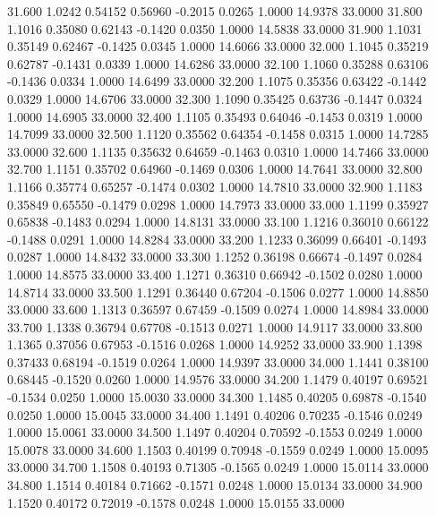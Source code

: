   31.600   1.0242   0.54152   0.56960  -0.2015   0.0265   1.0000  14.9378  33.0000
  31.800   1.1016   0.35080   0.62143  -0.1420   0.0350   1.0000  14.5838  33.0000
  31.900   1.1031   0.35149   0.62467  -0.1425   0.0345   1.0000  14.6066  33.0000
  32.000   1.1045   0.35219   0.62787  -0.1431   0.0339   1.0000  14.6286  33.0000
  32.100   1.1060   0.35288   0.63106  -0.1436   0.0334   1.0000  14.6499  33.0000
  32.200   1.1075   0.35356   0.63422  -0.1442   0.0329   1.0000  14.6706  33.0000
  32.300   1.1090   0.35425   0.63736  -0.1447   0.0324   1.0000  14.6905  33.0000
  32.400   1.1105   0.35493   0.64046  -0.1453   0.0319   1.0000  14.7099  33.0000
  32.500   1.1120   0.35562   0.64354  -0.1458   0.0315   1.0000  14.7285  33.0000
  32.600   1.1135   0.35632   0.64659  -0.1463   0.0310   1.0000  14.7466  33.0000
  32.700   1.1151   0.35702   0.64960  -0.1469   0.0306   1.0000  14.7641  33.0000
  32.800   1.1166   0.35774   0.65257  -0.1474   0.0302   1.0000  14.7810  33.0000
  32.900   1.1183   0.35849   0.65550  -0.1479   0.0298   1.0000  14.7973  33.0000
  33.000   1.1199   0.35927   0.65838  -0.1483   0.0294   1.0000  14.8131  33.0000
  33.100   1.1216   0.36010   0.66122  -0.1488   0.0291   1.0000  14.8284  33.0000
  33.200   1.1233   0.36099   0.66401  -0.1493   0.0287   1.0000  14.8432  33.0000
  33.300   1.1252   0.36198   0.66674  -0.1497   0.0284   1.0000  14.8575  33.0000
  33.400   1.1271   0.36310   0.66942  -0.1502   0.0280   1.0000  14.8714  33.0000
  33.500   1.1291   0.36440   0.67204  -0.1506   0.0277   1.0000  14.8850  33.0000
  33.600   1.1313   0.36597   0.67459  -0.1509   0.0274   1.0000  14.8984  33.0000
  33.700   1.1338   0.36794   0.67708  -0.1513   0.0271   1.0000  14.9117  33.0000
  33.800   1.1365   0.37056   0.67953  -0.1516   0.0268   1.0000  14.9252  33.0000
  33.900   1.1398   0.37433   0.68194  -0.1519   0.0264   1.0000  14.9397  33.0000
  34.000   1.1441   0.38100   0.68445  -0.1520   0.0260   1.0000  14.9576  33.0000
  34.200   1.1479   0.40197   0.69521  -0.1534   0.0250   1.0000  15.0030  33.0000
  34.300   1.1485   0.40205   0.69878  -0.1540   0.0250   1.0000  15.0045  33.0000
  34.400   1.1491   0.40206   0.70235  -0.1546   0.0249   1.0000  15.0061  33.0000
  34.500   1.1497   0.40204   0.70592  -0.1553   0.0249   1.0000  15.0078  33.0000
  34.600   1.1503   0.40199   0.70948  -0.1559   0.0249   1.0000  15.0095  33.0000
  34.700   1.1508   0.40193   0.71305  -0.1565   0.0249   1.0000  15.0114  33.0000
  34.800   1.1514   0.40184   0.71662  -0.1571   0.0248   1.0000  15.0134  33.0000
  34.900   1.1520   0.40172   0.72019  -0.1578   0.0248   1.0000  15.0155  33.0000
